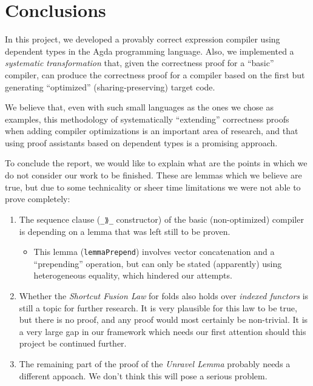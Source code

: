 \documentclass[a4paper]{article}
\begin{document}
    \section{Conclusions}
    \label{sec:conclusions}
        In this project, we developed a provably correct expression compiler using dependent types in the Agda programming language.
        Also, we implemented a \emph{systematic transformation} that, given the correctness proof for
        a ``basic'' compiler, can produce the correctness proof for a compiler based on the first but
        generating ``optimized'' (sharing-preserving) target code.

        We believe that, even with such small languages as the ones we chose as examples,
        this methodology of systematically ``extending'' correctness proofs when adding compiler optimizations
        is an important area of research, and that using proof assistants based on dependent types is a
        promising approach.

        To conclude the report, we would like to explain what are the points in which we do not consider our work
        to be finished. These are lemmas which we believe are true, but due to some technicality or sheer
        time limitations we were not able to prove completely:

        \begin{enumerate}
            \item The sequence clause (\texttt{\_⟫\_} constructor) of the basic (non-optimized) compiler
                is depending on a lemma that was left still to be proven.
                \begin{itemize}
                    \item This lemma (\texttt{lemmaPrepend}) involves vector concatenation and a ``prepending'' operation,
                        but can only be stated (apparently) using heterogeneous equality, which hindered our attempts.
                \end{itemize}
                
            \item Whether the \emph{Shortcut Fusion Law} for folds also holds over \emph{indexed functors} is still a topic for further research. It
                  is very plausible for this law to be true, but there is no proof, and any proof would most certainly be non-trivial. It is a very large
                  gap in our framework which needs our first attention should this project be continued further.

            \item The remaining part of the proof of the \emph{Unravel Lemma} probably needs a different appoach. We don't think this will pose a serious
                  problem.
        \end{enumerate}
\end{document}
